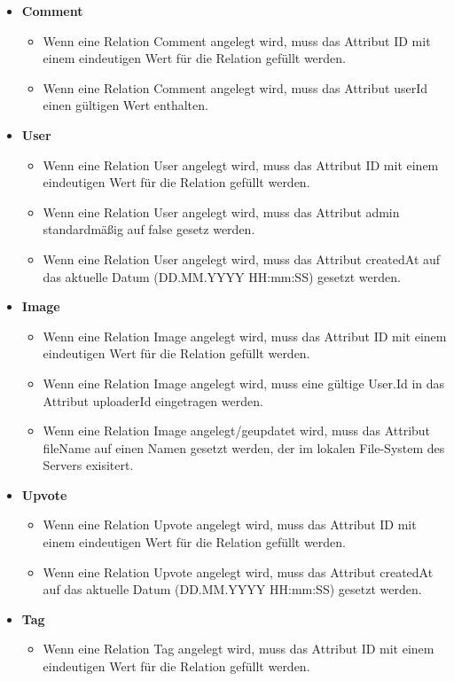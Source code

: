 \documentclass[12pt, oneside, a4paper]{article}		%
\begin{document}
\begin{itemize}
	\item \textbf{Comment}
	\begin{itemize}
		\item Wenn eine Relation Comment angelegt wird, muss das Attribut ID mit einem eindeutigen Wert für die Relation gefüllt werden.
		\item Wenn eine Relation Comment angelegt wird, muss das Attribut userId einen gültigen Wert enthalten.
	\end{itemize}
	\item \textbf{User}
	\begin{itemize}
		\item Wenn eine Relation User angelegt wird, muss das Attribut ID mit einem eindeutigen Wert für die Relation gefüllt werden.
		\item Wenn eine Relation User angelegt wird, muss das Attribut admin standardmäßig auf false gesetz werden.
		\item Wenn eine Relation User angelegt wird, muss das Attribut createdAt auf das aktuelle Datum (DD.MM.YYYY HH:mm:SS) gesetzt werden.
	\end{itemize}
	\item \textbf{Image}
	\begin{itemize}
		\item Wenn eine Relation Image angelegt wird, muss das Attribut ID mit einem eindeutigen Wert für die Relation gefüllt werden.
		\item Wenn eine Relation Image angelegt wird, muss eine gültige User.Id in das Attribut uploaderId eingetragen werden.
		\item Wenn eine Relation Image angelegt/geupdatet wird, muss das Attribut fileName auf einen Namen gesetzt werden, der im lokalen File-System des Servers exisitert.
	\end{itemize}
	\item \textbf{Upvote}
	\begin{itemize}
		\item Wenn eine Relation Upvote angelegt wird, muss das Attribut ID mit einem eindeutigen Wert für die Relation gefüllt werden.
		\item Wenn eine Relation Upvote angelegt wird, muss das Attribut createdAt auf das aktuelle Datum (DD.MM.YYYY HH:mm:SS) gesetzt werden.
	\end{itemize}
	\item \textbf{Tag}
	\begin{itemize}
		\item Wenn eine Relation Tag angelegt wird, muss das Attribut ID mit einem eindeutigen Wert für die Relation gefüllt werden.

\end{itemize}
\end{itemize}
\end{document}
